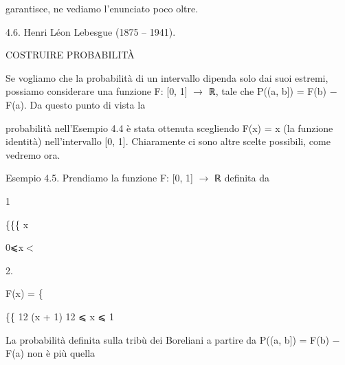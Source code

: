 \documentclass[a4paper,portrait,12pt]{article}
\begin{document}
\begin{flushleft}
garantisce, ne vediamo l'enunciato poco oltre.
\end{flushleft}


\begin{flushleft}
4.6. Henri L\'{e}on Lebesgue (1875 -- 1941).
\end{flushleft}










\begin{flushleft}
COSTRUIRE PROBABILIT\`{A}
\end{flushleft}





\begin{flushleft}
Se vogliamo che la probabilit\`{a} di un intervallo dipenda solo dai suoi estremi, possiamo considerare una funzione F: [0, 1] $\rightarrow$ ℝ, tale che P((a, b]) = F(b) $-$ F(a). Da questo punto di vista la
\end{flushleft}


\begin{flushleft}
probabilit\`{a} nell'Esempio 4.4 \`{e} stata ottenuta scegliendo F(x) = x (la funzione identit\`{a}) nell'intervallo [0, 1]. Chiaramente ci sono altre scelte possibili, come vedremo ora.
\end{flushleft}


\begin{flushleft}
Esempio 4.5. Prendiamo la funzione F: [0, 1] $\rightarrow$ ℝ definita da
\end{flushleft}


1


\begin{flushleft}
\{\{\{ x
\end{flushleft}


\begin{flushleft}
0⩽x$<$
\end{flushleft}


2.


\begin{flushleft}
F(x) = \{
\end{flushleft}


\begin{flushleft}
\{\{ 12 (x + 1) 12 ⩽ x ⩽ 1
\end{flushleft}


\begin{flushleft}
La probabilit\`{a} definita sulla tribù dei Boreliani a partire da P((a, b]) = F(b) $-$ F(a) non \`{e} più quella
\end{flushleft}
\end{document}
